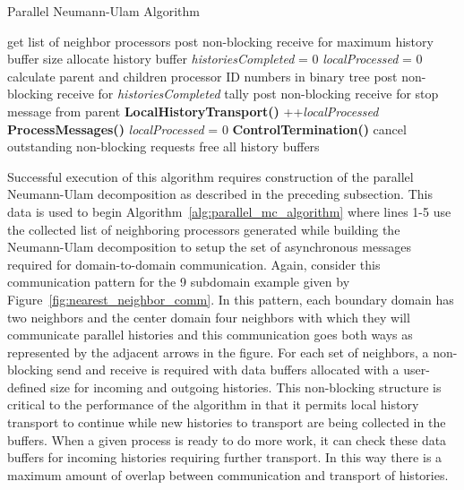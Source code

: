 \documentclass[letterpaper,11pt]{article}
\begin{document}
\begin{algorithm}[h!]
  \caption{Parallel Neumann-Ulam Algorithm}
  \label{alg:parallel_mc_algorithm}
  \begin{algorithmic}[1]
    \State get list of neighbor processors 
    \State post non-blocking receive for maximum history buffer size
    \State allocate history buffer
    \EndFor
    \State \textit{historiesCompleted} = 0
    \State \textit{localProcessed} = 0
    \State calculate parent and children processor ID numbers in
    binary tree
    \State post non-blocking receive for \textit{historiesCompleted} tally
    \EndFor
    \State post non-blocking receive for stop message from parent
    \State \textbf{LocalHistoryTransport()}
    \State ++\textit{localProcessed}
    \EndIf
    \State \textbf{ProcessMessages()}
    \State \textit{localProcessed} = 0
    \EndIf
    \State \textbf{ControlTermination()}
    \EndIf
    \EndWhile
    \State cancel outstanding non-blocking requests
    \State free all history buffers
  \end{algorithmic}
\end{algorithm}

Successful execution of this algorithm requires construction of the
parallel Neumann-Ulam decomposition as described in the preceding
subsection. This data is used to begin
Algorithm~\ref{alg:parallel_mc_algorithm} where lines 1-5 use the
collected list of neighboring processors generated while building the
Neumann-Ulam decomposition to setup the set of asynchronous messages
required for domain-to-domain communication. Again, consider this
communication pattern for the 9 subdomain example given by
Figure~\ref{fig:nearest_neighbor_comm}. In this pattern, each boundary
domain has two neighbors and the center domain four neighbors with
which they will communicate parallel histories and this communication
goes both ways as represented by the adjacent arrows in the
figure. For each set of neighbors, a non-blocking send and receive is
required with data buffers allocated with a user-defined size for
incoming and outgoing histories. This non-blocking structure is
critical to the performance of the algorithm in that it permits local
history transport to continue while new histories to transport are
being collected in the buffers. When a given process is ready to do
more work, it can check these data buffers for incoming histories
requiring further transport. In this way there is a maximum amount of
overlap between communication and transport of histories.
\end{document}
